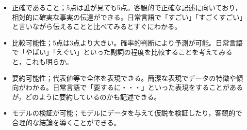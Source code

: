 \begin{itemize}
	\item 正確であること；5点は誰が見ても5点。客観的で正確な記述に向いており，相対的に確実な事実の伝達ができる。日常言語で「すごい」「すごくすごい」と言いながら伝えることと比べてみるとすぐにわかる。
	\item 比較可能性；5点は3点より大きい。確率的判断により予測が可能。日常言語で「やばい」「えぐい」といった副詞の程度を比較することを考えてみると，これも明らか。
	\item 要約可能性；代表値等で全体を表現できる。簡潔な表現でデータの特徴や傾向がわかる。日常言語で「要するに・・・」といった表現をすることがあるが，どのように要約しているのかも記述できる。
	\item モデルの検証が可能；モデルにデータを与えて仮説を検証したり，客観的で合理的な結論を導くことができる。
\end{itemize}
